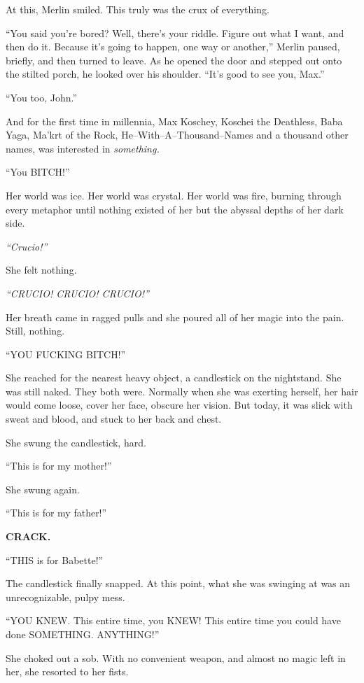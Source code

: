 At this, Merlin smiled. This truly was the crux of everything.

“You said you’re bored? Well, there’s your riddle. Figure out what I want, and then do it. Because it’s going to happen, one way or another,” Merlin paused, briefly, and then turned to leave. As he opened the door and stepped out onto the stilted porch, he looked over his shoulder. “It’s good to see you, Max.”

“You too, John.”

And for the first time in millennia, Max Koschey, Koschei the Deathless, Baba Yaga, Ma’krt of the Rock, He\mbox{--}With\mbox{--}A\mbox{--}Thousand\mbox{--}Names and a thousand other names, was interested in \emph{something.}
\simpleline
{}

“You BITCH!”

Her world was ice. Her world was crystal. Her world was fire, burning through every metaphor until nothing existed of her but the abyssal depths of her dark side.

\emph{“Crucio!”}

She felt nothing.

\emph{“CRUCIO! CRUCIO! CRUCIO!”}

Her breath came in ragged pulls and she poured all of her magic into the pain. Still, nothing.

“YOU FUCKING BITCH!”

She reached for the nearest heavy object, a candlestick on the nightstand. She was still naked. They both were. Normally when she was exerting herself, her hair would come loose, cover her face, obscure her vision. But today, it was slick with sweat and blood, and stuck to her back and chest.

She swung the candlestick, hard.

“This is for my mother!”

She swung again.

“This is for my father!”

\textbf{CRACK.}

“THIS is for Babette!”

The candlestick finally snapped. At this point, what she was swinging at was an unrecognizable, pulpy mess.

“YOU KNEW. This entire time, you KNEW! This entire time you could have done SOMETHING. ANYTHING!”

She choked out a sob. With no convenient weapon, and almost no magic left in her, she resorted to her fists.


